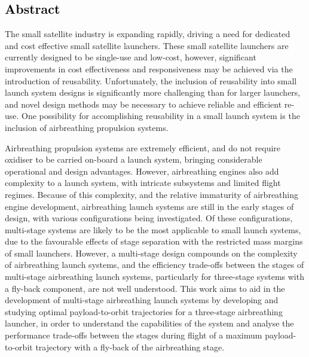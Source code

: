 \cleardoublepage
\textcolor{black}{
\section*{Abstract}
}
\noindent
 The small satellite industry is expanding rapidly, driving a need for dedicated and cost effective small satellite launchers.  
These small satellite launchers are currently designed to be single-use and low-cost, however, significant improvements in cost effectiveness and responsiveness may be achieved via the introduction of reusability. Unfortunately, the inclusion of reusability into small launch system designs is significantly more challenging than for larger launchers, and novel design methods may be necessary to achieve reliable and efficient re-use. One possibility for accomplishing reusability in a small launch system is the inclusion of airbreathing propulsion systems.

Airbreathing propulsion systems are extremely efficient, and do not require oxidiser to be carried on-board a launch system, bringing considerable operational and design advantages. 
However, airbreathing engines also add complexity to a launch system, with intricate subsystems and limited flight regimes. Because of this complexity, and the relative immaturity of airbreathing engine development, airbreathing launch systems are still in the early stages of design, with various configurations being investigated. Of these configurations, multi-stage systems are likely to be the most applicable to small launch systems, due to the favourable effects of stage separation with the restricted mass margins of small launchers. However, a multi-stage design compounds on the complexity of airbreathing launch systems, and the efficiency trade-offs between the stages of multi-stage airbreathing launch systems, particularly for three-stage systems with a fly-back component, are not well understood. This work aims to aid in the development of multi-stage airbreathing launch systems by developing and studying optimal payload-to-orbit trajectories for a three-stage airbreathing launcher, in order to understand the capabilities of the system and analyse the performance trade-offs between the stages during flight of a maximum payload-to-orbit trajectory with a fly-back of the airbreathing stage.



